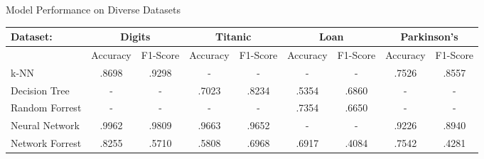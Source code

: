 \documentclass{article}
\begin{document}

\vspace*{\fill}

\begin{center}
    {\large Model Performance on Diverse Datasets}
    \begin{table}[h]
    \begin{tabular}{l|cc|cc|cc|cc}
    Dataset:             & \multicolumn{2}{c|}{Digits}                                   & \multicolumn{2}{c|}{Titanic}                                  & \multicolumn{2}{c|}{Loan}                                     & \multicolumn{2}{c}{Parkinson's}                               \\ \hline
                         & Accuracy                      & F1-Score                      & Accuracy                      & F1-Score                      & Accuracy                      & F1-Score                      & Accuracy                      & F1-Score                      \\ \cline{2-9} 
    k-NN                 & .8698                         & .9298                         & -                             & -                             & -                             & -                             & .7526                        & .8557                             \\
    Decision Tree        & -                             & -                             & .7023                         & .8234                         & .5354                         & \cellcolor[HTML]{C0C0C0}.6860 & -                             & -                             \\
    Random Forrest       & -                             & -                             & -                             & -                             & \cellcolor[HTML]{C0C0C0}.7354 & .6650                         & -                             & -                             \\
    Neural Network       & \cellcolor[HTML]{C0C0C0}.9962 & \cellcolor[HTML]{C0C0C0}.9809 & \cellcolor[HTML]{C0C0C0}.9663 & \cellcolor[HTML]{C0C0C0}.9652 & -                             & -                             & \cellcolor[HTML]{C0C0C0}.9226 & \cellcolor[HTML]{C0C0C0}.8940 \\
    Network Forrest & .8255                            & .5710                             & .5808                             & .6968                             & .6917                             & .4084                             & .7542                             & .4281                            
    \end{tabular}
    \end{table}
\end{center}
\end{document}
